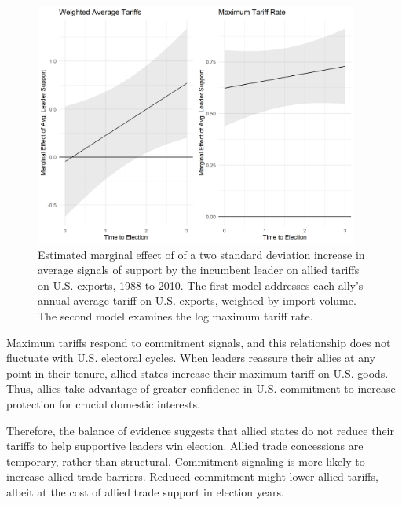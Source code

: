 \documentclass[12pt]{article}
\begin{document}
\begin{figure}[htpb]
	\centering
		\includegraphics[width=0.95\textwidth]{../figures/tariff-me.png}
	\caption{Estimated marginal effect of of a two standard deviation increase in average signals of support by the incumbent leader on allied tariffs on U.S. exports, 1988 to 2010. The first model addresses each ally's annual average tariff on U.S. exports, weighted by import volume. The second model examines the log maximum tariff rate.}
	\label{fig:tariff-me}
\end{figure}


Maximum tariffs respond to commitment signals, and this relationship does not fluctuate with U.S. electoral cycles.
When leaders reassure their allies at any point in their tenure, allied states increase their maximum tariff on U.S. goods.
Thus, allies take advantage of greater confidence in U.S. commitment to increase protection for crucial domestic interests.


Therefore, the balance of evidence suggests that allied states do not reduce their tariffs to help supportive leaders win election.
Allied trade concessions are temporary, rather than structural.
Commitment signaling is more likely to increase allied trade barriers.
Reduced commitment might lower allied tariffs, albeit at the cost of allied trade support in election years.


\newpage
\singlespace
 
 
\end{document}
